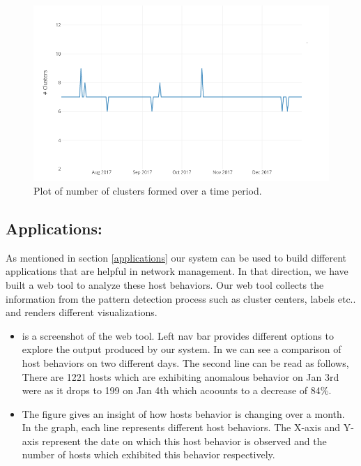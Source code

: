 \begin{figure}[t]
	\centerline{\includegraphics{constant.png}}
	\caption{ Plot of number of clusters formed over a time period.}%
\end{figure}




\subsection{Applications:}

 As mentioned in section \ref{applications} our system can be used to build different applications that are helpful in network management. In that direction, we have built a web tool to analyze these host behaviors. Our web tool collects the information from the pattern detection process such as cluster centers, labels etc.. and renders different visualizations.
 
 \begin{itemize}
 	\item {} is a screenshot of the web tool. Left nav bar provides different options to explore the output produced by our system. In  we can see a comparison of host behaviors on two different days. The second line can be read as follows, There are 1221 hosts which are exhibiting anomalous behavior on Jan 3rd were as it drops to 199 on Jan 4th which acoounts to a decrease of 84\%. 
 	
 	\item The figure  gives an insight of how hosts behavior is changing over a month.
 	In the graph, each line represents different host behaviors. The X-axis and Y-axis
 	represent the date on which this host behavior is observed and the number of hosts
 	which exhibited this behavior respectively.
 	
 \end{itemize}
 
